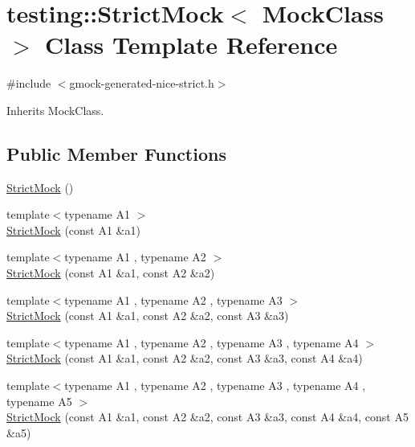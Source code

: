 \hypertarget{classtesting_1_1StrictMock}{}\section{testing\+::Strict\+Mock$<$ Mock\+Class $>$ Class Template Reference}
\label{classtesting_1_1StrictMock}


{\ttfamily \#include $<$gmock-\/generated-\/nice-\/strict.\+h$>$}



Inherits Mock\+Class.

\subsection*{Public Member Functions}
\begin{DoxyCompactItemize}
\item 
\mbox{\hyperlink{classtesting_1_1StrictMock_ad609d745db75306dd3b360b5410923fe}{Strict\+Mock}} ()
\item 
{\footnotesize template$<$typename A1 $>$ }\\\mbox{\hyperlink{classtesting_1_1StrictMock_a42db27ba0af29804db8589676817aff8}{Strict\+Mock}} (const A1 \&a1)
\item 
{\footnotesize template$<$typename A1 , typename A2 $>$ }\\\mbox{\hyperlink{classtesting_1_1StrictMock_a345933f3f1a10de381a508f93e680c6b}{Strict\+Mock}} (const A1 \&a1, const A2 \&a2)
\item 
{\footnotesize template$<$typename A1 , typename A2 , typename A3 $>$ }\\\mbox{\hyperlink{classtesting_1_1StrictMock_acc25729cd85a3a412106863894a30fe7}{Strict\+Mock}} (const A1 \&a1, const A2 \&a2, const A3 \&a3)
\item 
{\footnotesize template$<$typename A1 , typename A2 , typename A3 , typename A4 $>$ }\\\mbox{\hyperlink{classtesting_1_1StrictMock_a6b42ef1460901ea91a2a09f44ae8fba2}{Strict\+Mock}} (const A1 \&a1, const A2 \&a2, const A3 \&a3, const A4 \&a4)
\item 
{\footnotesize template$<$typename A1 , typename A2 , typename A3 , typename A4 , typename A5 $>$ }\\\mbox{\hyperlink{classtesting_1_1StrictMock_a2019f4e86224b2adbb9e9326bc175c50}{Strict\+Mock}} (const A1 \&a1, const A2 \&a2, const A3 \&a3, const A4 \&a4, const A5 \&a5)
\item 

\end{DoxyCompactItemize}
